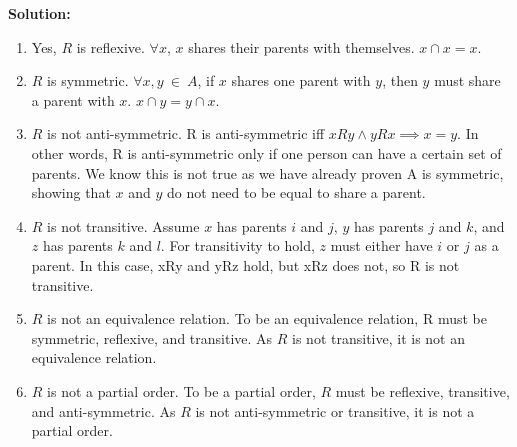 \begin{enumerate}
    \textbf{Solution: }
    \begin{enumerate}
        \item Yes, \(R\) is reflexive. \(\forall x\), \(x\) shares their parents with themselves. \(x \cap x = x.\)
        \item \(R\) is symmetric. \(\forall x, y \ \in \ A\), if \(x\) shares one parent with \(y\), then \(y\) must share a parent with \(x\). \(x \cap y = y \cap x.\)
        \item \(R\) is not anti-symmetric. R is anti-symmetric iff \(xRy \land yRx \implies x = y.\) In other words, R is anti-symmetric only if one person can have a certain set of parents. We know this is not true as we have already proven A is symmetric, showing that \(x\) and \(y\) do not need to be equal to share a parent. 
        \item \(R\) is not transitive. Assume \(x\) has parents \(i\) and \(j\), \(y\) has parents \(j\) and \(k\), and \(z\) has parents \(k\) and \(l\). For transitivity to hold, \(z\) must either have \(i\) or \(j\) as a parent. In this case, xRy and yRz hold, but xRz does not, so R is not transitive.
        \item \(R\) is not an equivalence relation. To be an equivalence relation, R must be symmetric, reflexive, and transitive. As \(R\) is not transitive, it is not an equivalence relation.
        \item \(R\) is not a partial order. To be a partial order, \(R\) must be reflexive, transitive, and anti-symmetric. As \(R\) is not anti-symmetric or transitive, it is not a partial order.
        \\\\
    \end{enumerate}
    

\end{enumerate}
